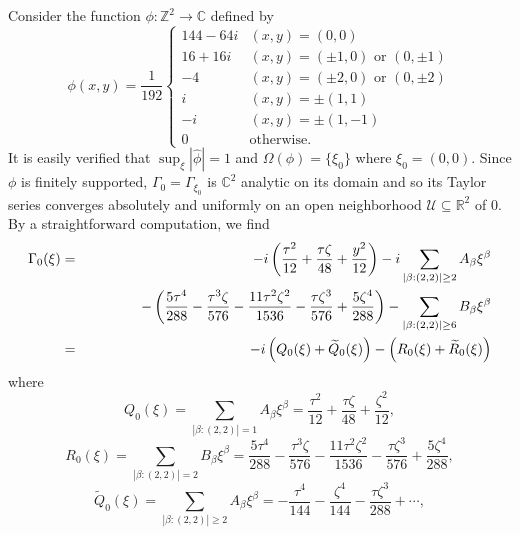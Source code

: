 \documentclass[11pt]{article}
\newenvironment{example}
  {\pushQED{\qed}\renewcommand{\qedsymbol}{$\triangle$}\examplex}
  {\popQED\endexamplex}
\theoremstyle{remark}
\newcommand{\lp}{\left(}
\newcommand{\rp}{\right)}
\newcommand{\f}[2]{\frac{#1}{#2}}
\begin{document}
\begin{example}\normalfont
Consider the function $\phi : \mathbb{Z}^2 \to \mathbb{C}$ defined by 
\begin{equation*}
    \phi(x,y) =
    \frac{1}{192}
    \begin{cases}
    144 - 64i &(x,y) = (0,0)\\
    16 + 16i &(x,y) = (\pm 1, 0)\mbox{ or }(0,\pm 1)\\
    -4        &(x,y) = (\pm 2,0)\mbox{ or }(0,\pm 2)\\
    i   &(x,y) = \pm(1,1)\\
    -i   &(x,y) = \pm(1,-1)\\
    0& \text{otherwise}.
    \end{cases}
\end{equation*}
It is easily verified that $\sup_{\xi}|\widehat{\phi}|=1$ and $\Omega(\phi) = \{\xi_0 \}$ where $\xi_0=(0,0)$. Since $\phi$ is finitely supported, $\Gamma_{0}=\Gamma_{\xi_0}$ is $\mathbb{C}^2$ analytic on its domain and so its Taylor series converges absolutely and uniformly on an open neighborhood $\mathcal{U}\subseteq \mathbb{R}^2$ of $0$. By a straightforward computation, we find
\begin{eqnarray*}
\Gamma_{0}(\xi)
&=& 
-i\lp \frac{\tau^2}{12} +\frac{\tau\zeta}{48} + \frac{y^2}{12}   \rp
-i \sum_{|\beta:(2,2)|\geq 2}A_\beta \xi^\beta\\
&& 
\hspace{1.3cm}-\lp \frac{5\tau^4}{288} -\f{\tau^3\zeta}{576} -\frac{11\tau^2\zeta^2}{1536}-\frac{\tau\zeta^3}{576} + \frac{5\zeta^4}{288}  \rp 
- \sum_{|\beta:(2,2)|\geq 6}B_\beta \xi^\beta\\
&=&-i\lp Q_{0}(\xi)+\widetilde{Q}_{0}(\xi)\rp-\lp R_0(\xi)+\widetilde{R}_0(\xi)\rp
\end{eqnarray*}
where
\begin{equation*}
Q_{0}(\xi)=\sum_{|\beta:(2,2)|=1}A_\beta \xi^\beta=\frac{\tau^2}{12} +\frac{\tau\zeta}{48} + \frac{\zeta^2}{12},
\end{equation*}
\begin{equation*}
R_{0}(\xi)=\sum_{|\beta:(2,2)|=2}B_\beta\xi^\beta
= \frac{5\tau^4}{288} -\f{\tau^3\zeta}{576} -\frac{11\tau^2\zeta^2}{1536}-\frac{\tau\zeta^3}{576} + \frac{5\zeta^4}{288}, 
\end{equation*}
\begin{equation*}
\widetilde{Q}_{0}(\xi)= \sum_{|\beta:(2,2)|\geq 2}A_\beta \xi^\beta= - \frac{\tau^4}{144}  - \frac{\zeta^4}{144} - \frac{\tau\zeta^3}{288} + \cdots, 

\end{equation*}
\end{example}
\end{document}
